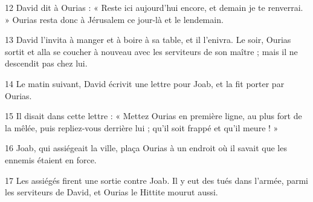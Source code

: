 
12 David dit à Ourias : « Reste ici aujourd’hui encore, et demain je te renverrai. » Ourias resta donc à Jérusalem ce jour-là et le lendemain.

13 David l’invita à manger et à boire à sa table, et il l’enivra. Le soir, Ourias sortit et alla se coucher à nouveau avec les serviteurs de son maître ; mais il ne descendit pas chez lui.

14 Le matin suivant, David écrivit une lettre pour Joab, et la fit porter par Ourias.

15 Il disait dans cette lettre : « Mettez Ourias en première ligne, au plus fort de la mêlée, puis repliez-vous derrière lui ; qu’il soit frappé et qu’il meure ! »

16 Joab, qui assiégeait la ville, plaça Ourias à un endroit où il savait que les ennemis étaient en force.

17 Les assiégés firent une sortie contre Joab. Il y eut des tués dans l’armée, parmi les serviteurs de David, et Ourias le Hittite mourut aussi.